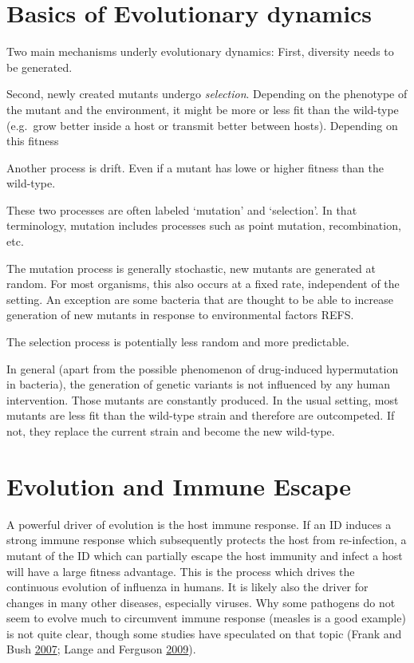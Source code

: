 \documentclass[
]{book}
\begin{document}
\hypertarget{basics-of-evolutionary-dynamics}{%
\section{Basics of Evolutionary dynamics}\label{basics-of-evolutionary-dynamics}}

Two main mechanisms underly evolutionary dynamics: First, diversity needs to be generated.

Second, newly created mutants undergo \emph{selection}. Depending on the phenotype of the mutant and the environment, it might be more or less fit than the wild-type (e.g.~grow better inside a host or transmit better between hosts). Depending on this fitness

Another process is drift. Even if a mutant has lowe or higher fitness than the wild-type.

These two processes are often labeled `mutation' and `selection'. In that terminology, mutation includes processes such as point mutation, recombination, etc.

The mutation process is generally stochastic, new mutants are generated at random. For most organisms, this also occurs at a fixed rate, independent of the setting. An exception are some bacteria that are thought to be able to increase generation of new mutants in response to environmental factors REFS.

The selection process is potentially less random and more predictable.

In general (apart from the possible phenomenon of drug-induced hypermutation in bacteria), the generation of genetic variants is not influenced by any human intervention. Those mutants are constantly produced. In the usual setting, most mutants are less fit than the wild-type strain and therefore are outcompeted. If not, they replace the current strain and become the new wild-type.

\hypertarget{evolution-and-immune-escape}{%
\section{Evolution and Immune Escape}\label{evolution-and-immune-escape}}

A powerful driver of evolution is the host immune response. If an ID induces a strong immune response which subsequently protects the host from re-infection, a mutant of the ID which can partially escape the host immunity and infect a host will have a large fitness advantage. This is the process which drives the continuous evolution of influenza in humans. It is likely also the driver for changes in many other diseases, especially viruses. Why some pathogens do not seem to evolve much to circumvent immune response (measles is a good example) is not quite clear, though some studies have speculated on that topic (Frank and Bush \protect\hyperlink{ref-frank07}{2007}; Lange and Ferguson \protect\hyperlink{ref-lange09}{2009}).
\end{document}
